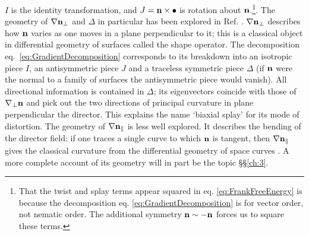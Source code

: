 $I$ is the identity transformation, and $J= \bf n \times \bullet$ is rotation about $\bf n$.\footnote{That the twist and splay terms appear squared in eq. \ref{eq:FrankFreeEnergy} is because the decomposition eq. \ref{eq:GradientDecomposition} is for vector order, not nematic order. The additional symmetry $\bf n \sim -n$ forces us to square these terms.}. The geometry of $\nabla \bf n_\perp$ and $\Delta$ in particular has been explored in Ref. \citep{Machon2016b}. $\nabla \bf n_\perp$ describes how $\bf n$ varies as one moves in a plane perpendicular to it; this is a classical object in differential geometry of surfaces called the shape operator. The decomposition eq.~\ref{eq:GradientDecomposition} corresponds to its breakdown into an isotropic piece $I$, an antisymmetric piece $J$ and a traceless symmetric piece $\Delta$ (if $\bf n$ were the normal to a family of surfaces the antisymmetric piece would vanish). All directional information is contained in $\Delta$; its eigenvectors coincide with those of $\nabla_\perp \bf n$ and pick out the two directions of principal curvature in plane perpendicular the director. This explains the name `biaxial splay' for its mode of distortion. The geometry of $\nabla \bf n_\parallel$ is less well explored. It describes the bending of the director field: if one traces a single curve to which $\bf n$ is tangent, then $\nabla \bf n _\parallel$ gives the classical curvature from the differential geometry of space curves \citep{DoCarmoBook}. A more complete account of its geometry will in part be the topic \S\S\ref{ch:3}.
 
